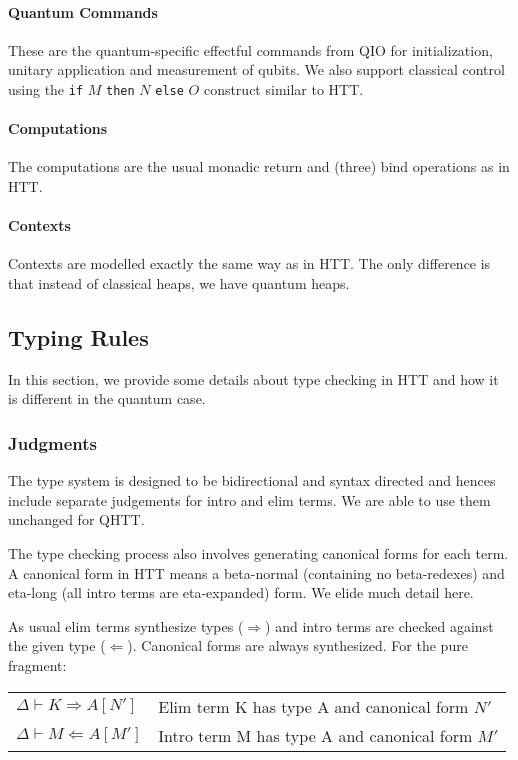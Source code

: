 \documentclass[acmsmall,nonacm,timestamp]{acmart}
\begin{document}
\paragraph{Quantum Commands}
These are the quantum-specific effectful commands from QIO for initialization, unitary application and measurement of qubits. We also support classical control using the \texttt{if} $M$ \texttt{then} $N$ \texttt{else} $O$ construct similar to HTT.

\paragraph{Computations} The computations are the usual monadic return and (three) bind operations as in HTT.

\paragraph{Contexts} Contexts are modelled exactly the same way as in HTT. The only difference is that instead of classical heaps, we have quantum heaps.

\subsection{Typing Rules}
\label{sec:typing}

In this section, we provide some details about type checking in HTT and how it is different in the quantum case.

\subsubsection{Judgments}
The type system is designed to be bidirectional and syntax directed and hences include separate judgements for intro and elim terms. We are able to use them unchanged for QHTT.

The type checking process also involves generating canonical forms for each term. A canonical form in HTT means a beta-normal (containing no beta-redexes) and eta-long (all intro terms are eta-expanded) form. We elide much detail here.

As usual elim terms synthesize types ($\Rightarrow$) and intro terms are checked against the given type ($\Leftarrow$). Canonical forms are always synthesized. For the pure fragment:

\begin{center}
	\begin{tabular}{ll}
		$\Delta \vdash K \Rightarrow A [N']$ & Elim term K has type A and canonical form $N'$ \\
		$\Delta \vdash M \Leftarrow A [M']$ & Intro term M has type A and canonical form $M'$
	\end{tabular}
\end{center}
\end{document}

